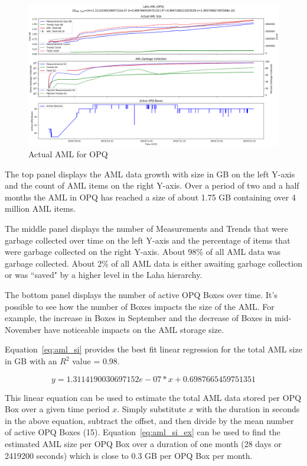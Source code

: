 \begin{figure}[H]
    \centering
    \includegraphics[width=\linewidth]{figures/actual_aml_opq.png}
    \caption{Actual AML for OPQ}
    \label{fig:actual_aml_opq}
\end{figure}

The top panel displays the AML data growth with size in GB on the left Y-axis and the count of AML items on the right Y-axis. Over a period of two and a half months the AML in OPQ has reached a size of about 1.75 GB containing over 4 million AML items.

The middle panel displays the number of Measurements and Trends that were garbage collected over time on the left Y-axis and the percentage of items that were garbage collected on the right Y-axis. About 98\% of all AML data was garbage collected. About 2\% of all AML data is either awaiting garbage collection or was ``saved" by a higher level in the Laha hierarchy.

The bottom panel displays the number of active OPQ Boxes over time. It's possible to see how the number of Boxes impacts the size of the AML. For example, the increase in Boxes in September and the decrease of Boxes in mid-November have noticeable impacts on the AML storage size.

Equation~\ref{eq:aml_si} provides the best fit linear regression for the total AML size in GB with an $R^2$ value = 0.98.

\begin{equation}
    y = 1.3114190030697152e-07 * x + 0.6987665459751351
    \label{eq:aml_si}
\end{equation}

This linear equation can be used to estimate the total AML data stored per OPQ Box over a given time period $x$. Simply substitute $x$ with the duration in seconds in the above equation, subtract the offset, and then divide by the mean number of active OPQ Boxes (15). Equation~\ref{eq:aml_si_ex} can be used to find the estimated AML size per OPQ Box over a duration of one month (28 days or 2419200 seconds) which is close to 0.3 GB per OPQ Box per month.

